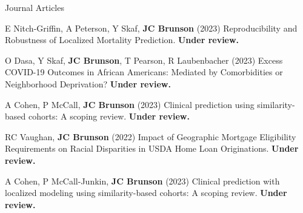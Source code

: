 \documentclass[10pt,a4paper]{article}
\begin{document}

\vspace{.25cm}
{\sc Journal Articles}
\begin{enumerate}[label={[\arabic*]},labelindent=1cm,nolistsep]
\item
E Nitch-Griffin, A Peterson, Y Skaf, {\bfseries JC Brunson} (2023) Reproducibility and Robustness of Localized Mortality Prediction. {\bfseries Under review.}
\item
O Dasa, Y Skaf, {\bfseries JC Brunson}, T Pearson, R Laubenbacher (2023) Excess COVID-19 Outcomes in African Americans: Mediated by Comorbidities or Neighborhood Deprivation? {\bfseries Under review.}
\item
A Cohen, P McCall, {\bfseries JC Brunson} (2023) Clinical prediction using similarity-based cohorts: A scoping review. {\bfseries Under review.}
\item
RC Vaughan, {\bfseries JC Brunson} (2022) Impact of Geographic Mortgage Eligibility Requirements on Racial Disparities in USDA Home Loan Originations. {\bfseries Under review.}
\item
A Cohen, P McCall-Junkin, {\bfseries JC Brunson} (2023) Clinical prediction with localized modeling using similarity-based cohorts: A scoping review. {\bfseries Under review.}

\end{enumerate}
\end{document}
